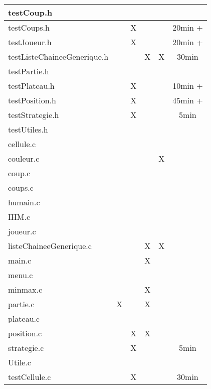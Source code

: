\begin{table}[h]
\begin{tabular}{l|c|c|c|c|c|}
\multicolumn{1}{|l|}{testCoup.h}&   &   &    &   &    \\ \hline
\multicolumn{1}{|l|}{testCoups.h}&   & X &    &   &  20min +  \\ \hline
\multicolumn{1}{|l|}{testJoueur.h}&   & X  &    &   &  20min +  \\ \hline
\multicolumn{1}{|l|}{testListeChaineeGenerique.h}&   &   &  X  & X  & 30min   \\ \hline
\multicolumn{1}{|l|}{testPartie.h}&   &   &    &   &    \\ \hline
\multicolumn{1}{|l|}{testPlateau.h}&   & X  &    &   &   10min + \\ \hline
\multicolumn{1}{|l|}{testPosition.h}&   & X  &    &   &   45min + \\ \hline
\multicolumn{1}{|l|}{testStrategie.h}&   &  X &    &   &   5min \\ \hline
\multicolumn{1}{|l|}{testUtiles.h}&   &   &    &   &    \\ \hline
\multicolumn{1}{|l|}{cellule.c}&  &   &  &   &  \\ \hline
\multicolumn{1}{|l|}{couleur.c}&  &   &  & X  &  \\ \hline
\multicolumn{1}{|l|}{coup.c}&  &   &  &   &  \\ \hline
\multicolumn{1}{|l|}{coups.c}&  &   &  &   &  \\ \hline
\multicolumn{1}{|l|}{humain.c}&  &   &  &   &  \\ \hline
\multicolumn{1}{|l|}{IHM.c}&  &   &  &   &  \\ \hline
\multicolumn{1}{|l|}{joueur.c}&  &   &  &   &  \\ \hline
\multicolumn{1}{|l|}{listeChaineeGenerique.c}&  &   & X &  X & \\ \hline
\multicolumn{1}{|l|}{main.c}&  &   & X &   &  \\ \hline
\multicolumn{1}{|l|}{menu.c}&  &   &  &   &  \\ \hline
\multicolumn{1}{|l|}{minmax.c}&  &   & X &   &  \\ \hline
\multicolumn{1}{|l|}{partie.c}& X  &   & X &   &  \\ \hline
\multicolumn{1}{|l|}{plateau.c}&  &   &  &   &  \\ \hline
\multicolumn{1}{|l|}{position.c}&  & X & X &   &  \\ \hline
\multicolumn{1}{|l|}{strategie.c}&  & X   &  &   &  5min\\ \hline
\multicolumn{1}{|l|}{Utile.c}&  &   &  &   &  \\ \hline
\multicolumn{1}{|l|}{testCellule.c}&  &  X &  &   &  30min\\ \hline

\end{tabular}
\end{table}
